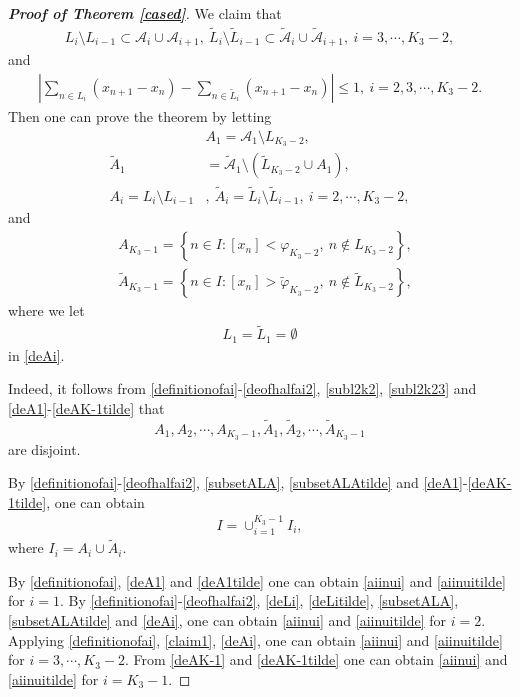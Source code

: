 \documentclass[12pt]{amsart}
\newcommand{\abs}[1]{\left\lvert #1 \right\rvert}
\theoremstyle{plain}
\theoremstyle{definition}
\begin{document}
\begin{proof}[\textbf{Proof of Theorem \ref{cased}}]
We claim that
\begin{align}
L_{i}\setminus L_{i-1}\subset \mathcal{A}_{i}\cup \mathcal{A}_{i+1},\ \tilde{L}_{i}\setminus \tilde{L}_{i-1}\subset \tilde{\mathcal{A}}_{i}\cup \tilde{\mathcal{A}}_{i+1},\ i=3,\cdots,K_3-2,\label{claim1}
\end{align}
and 
\begin{align}
\abs{\sum_{n\in L_i}(x_{n+1}-x_n)-\sum_{n\in \tilde{L}_i}(x_{n+1}-x_n)}\leq 1, \ i=2,3,\cdots,K_3-2.\label{claim2}
\end{align}
Then one can prove the theorem by letting 
\begin{align} &A_1=\mathcal{A}_1\setminus L_{K_3-2},\label{deA1}\\ \tilde{A}_1&=\tilde{\mathcal{A}}_1\setminus\left(\tilde{L}_{K_3-2}\cup A_1\right),\label{deA1tilde}\\
A_i=L_i\setminus L_{i-1}&,\ \tilde{A}_i=\tilde{L}_i\setminus \tilde{L}_{i-1},\ i=2,\cdots,K_3-2,\label{deAi}
\end{align}
and
\begin{align}
&A_{K_3-1}=\left\{n\in I:\left[x_n\right]<\varphi_{K_3-2},\ n\notin L_{K_3-2}\right\},\label{deAK-1}\\
&\tilde{A}_{K_3-1}=\left\{n\in I:\left[x_n\right]>\tilde{\varphi}_{K_3-2},\ n\notin\tilde{L}_{K_3-2}\right\},\label{deAK-1tilde}
\end{align}
where we let 
\begin{align}
	L_1=\tilde{L}_1=\emptyset\label{L1L1tilde}
\end{align}
in \eqref{deAi}.

Indeed, it follows from \eqref{definitionofai}-\eqref{deofhalfai2}, \eqref{subl2k2}, \eqref{subl2k23} and \eqref{deA1}-\eqref{deAK-1tilde} that $$A_1,A_2,\cdots,A_{K_3-1},\tilde{A}_1,\tilde{A}_2,\cdots,\tilde{A}_{K_3-1}$$ 
are disjoint. 

By \eqref{definitionofai}-\eqref{deofhalfai2}, \eqref{subsetALA}, \eqref{subsetALAtilde} and \eqref{deA1}-\eqref{deAK-1tilde},
one can obtain
\begin{align}
	I=\cup_{i=1}^{K_3-1}I_i,\nonumber
\end{align}
where $I_i=A_i\cup \tilde{A}_i$.

By \eqref{definitionofai}, \eqref{deA1} and \eqref{deA1tilde} one can obtain \eqref{aiinui} and \eqref{aiinuitilde} for $i=1$. By \eqref{definitionofai}-\eqref{deofhalfai2}, \eqref{deLi}, \eqref{deLitilde}, \eqref{subsetALA}, \eqref{subsetALAtilde} and \eqref{deAi}, one can obtain \eqref{aiinui} and \eqref{aiinuitilde} for $i=2$.
Applying \eqref{definitionofai}, \eqref{claim1}, \eqref{deAi}, one can obtain \eqref{aiinui} and \eqref{aiinuitilde} for $i=3,\cdots,K_3-2$. 
From  \eqref{deAK-1} and \eqref{deAK-1tilde} one can obtain \eqref{aiinui} and \eqref{aiinuitilde} for $i=K_3-1$.


\end{proof}
\end{document}
